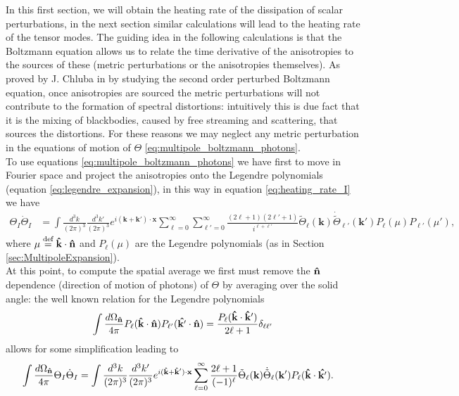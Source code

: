 In this first section, we will obtain the heating rate of the dissipation of scalar perturbations, in the next section similar calculations will lead to the heating rate of the tensor modes. The guiding idea in the following calculations is that the Boltzmann equation allows us to relate the time derivative of the anisotropies to the sources of these (metric perturbations or the anisotropies themselves). As proved by J. Chluba in \cite{Chluba_2x2} by studying the second order perturbed Boltzmann equation, once anisotropies are sourced the metric perturbations will not contribute to the formation of spectral distortions: intuitively this is due fact that it is the mixing of blackbodies, caused by free streaming and scattering, that sources the distortions. For these reasons we may neglect any metric perturbation in the equations of motion of $\Theta$ \eqref{eq:multipole_boltzmann_photons}.\\ To use equations \eqref{eq:multipole_boltzmann_photons} we have first to move in Fourier space and project the anisotropies onto the Legendre polynomials (equation \eqref{eq:legendre_expansion}), in this way in equation \eqref{eq:heating_rate_I} we have
\begin{align*}
    \Theta_I\dot \Theta_I&=\int\frac{d^3k}{(2\pi)^3}\frac{d^3k'}{(2\pi)^3}e^{i(\mathbf{k}+\mathbf{k}')\cdot\mathbf{x}}\sum_{\ell=0}^{\infty}\sum_{\ell'=0}^{\infty}\frac{(2\ell+1)(2\ell'+1)}{i^{\ell+\ell'}}\tilde\Theta_\ell(\mathbf{k})\dot{\tilde\Theta}_{\ell'}(\mathbf{k}')P_\ell(\mu)P_{\ell'}(\mu'),
\end{align*}
where $\mu\stackrel{\text{def}}{=}\mathbf{\hat{k}}\cdot\mathbf{\hat{n}}$ and $P_\ell(\mu)$ are the Legendre polynomials (as in Section \ref{sec:MultipoleExpansion}). \\
At this point, to compute the spatial average we first must remove the $\mathbf{\hat{n}}$ dependence (direction of motion of photons) of $\Theta$ by averaging over the solid angle: the well known relation for the Legendre polynomials
$$\int\frac{d\Omega_{\mathbf{\hat{n}}}}{4\pi} P_\ell(\mathbf{\hat{k}}\cdot\mathbf{\hat{n}})P_{\ell'}(\mathbf{\hat{k'}}\cdot\mathbf{\hat{n}})=\frac{P_\ell(\mathbf{\hat{k}}\cdot\mathbf{\hat{k}}')}{2\ell+1}\delta_{\ell\ell'}$$
allows for some simplification leading to 
\begin{align*}
    \int\frac{d\Omega_{\mathbf{\hat{n}}}}{4\pi}\Theta_I\dot \Theta_I&=\int\frac{d^3k}{(2\pi)^3}\frac{d^3k'}{(2\pi)^3}e^{i(\mathbf{\hat{k}}+\mathbf{\hat{k}}')\cdot\mathbf{x}}\sum_{\ell=0}^{\infty}\frac{2\ell+1}{(-1)^{\ell}}\tilde\Theta_\ell(\mathbf{k})\dot{\tilde\Theta}_{\ell}(\mathbf{k}')P_\ell(\mathbf{\hat{k}}\cdot\mathbf{\hat{k'}}).
\end{align*}
